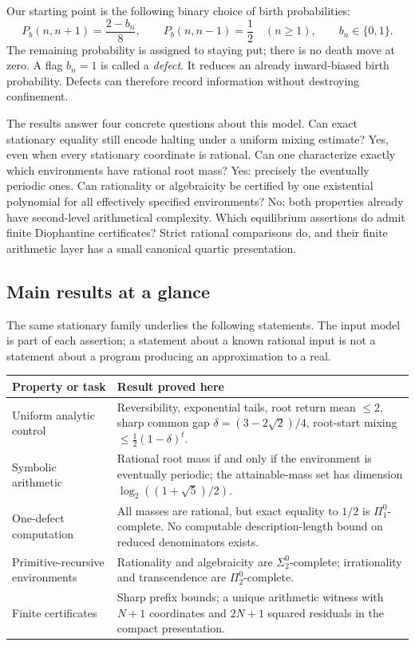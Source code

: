 \documentclass[11pt,letterpaper]{article}
\numberwithin{equation}{section}
\theoremstyle{definition}
\theoremstyle{remark}
\begin{document}
Our starting point is the following binary choice of birth probabilities:
\begin{equation}\label{pqc:rv:eq:kernel-intro}
 P_b(n,n+1)=\frac{2-b_n}{8},\qquad
 P_b(n,n-1)=\frac12\quad(n\geq1),\qquad b_n\in\{0,1\}.
\end{equation}
The remaining probability is assigned to staying put; there is no death
move at zero. A flag $b_n=1$ is called a \emph{defect}. It reduces an
already inward-biased birth probability. Defects can therefore record
information without destroying confinement.

The results answer four concrete questions about this model. Can exact
stationary equality still encode halting under a uniform mixing estimate?
Yes, even when every stationary coordinate is rational. Can one characterize
exactly which environments have rational root mass? Yes: precisely the
eventually periodic ones. Can rationality or algebraicity be certified by
one existential polynomial for all effectively specified environments?
No: both properties already have second-level arithmetical complexity.
Which equilibrium assertions do admit finite Diophantine certificates?
Strict rational comparisons do, and their finite arithmetic layer has a
small canonical quartic presentation.

\subsection{Main results at a glance}
The same stationary family underlies the following statements. The input
model is part of each assertion; a statement about a known rational input
is not a statement about a program producing an approximation to a real.

\begin{center}
\begin{tabularx}{\textwidth}{@{}p{}X@{}}
\toprule
Property or task & Result proved here \\
\midrule
Uniform analytic control & Reversibility, exponential tails, root return
mean $\leq2$, sharp common gap $\delta=(3-2\sqrt2)/4$, root-start
mixing $\leq\tfrac12(1-\delta)^t$. \\
Symbolic arithmetic & Rational root mass if and only if the environment
is eventually periodic; the attainable-mass set has dimension
$\log_2((1+\sqrt5)/2)$. \\
One-defect computation & All masses are rational, but exact equality to
$1/2$ is $\Pi^0_1$-complete. No computable description-length bound
on reduced denominators exists. \\
Primitive-recursive environments & Rationality and algebraicity are
$\Sigma^0_2$-complete; irrationality and transcendence are
$\Pi^0_2$-complete. \\
Finite certificates & Sharp prefix bounds; a unique arithmetic witness
with $N+1$ coordinates and $2N+1$ squared residuals in the compact presentation. \\
\bottomrule
\end{tabularx}
\end{center}
\end{document}
